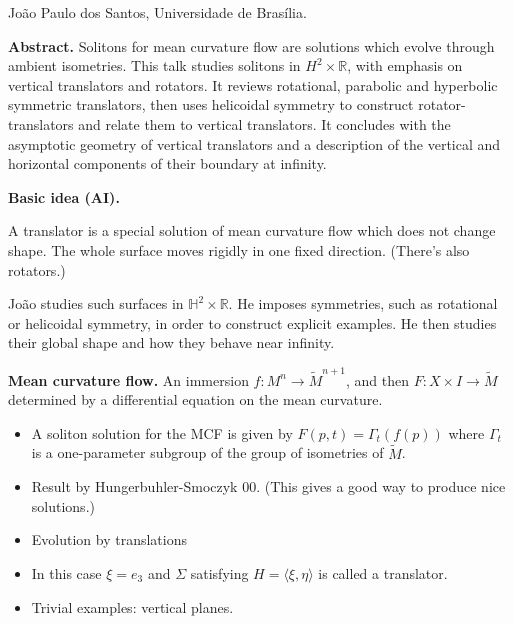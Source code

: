 \medskip\noindent
Jo\~ao Paulo dos Santos,
Universidade de Bras\'ilia.

\medskip\noindent
{\bf Abstract.}
Solitons for mean curvature flow are
solutions which evolve through ambient
isometries. This talk studies solitons in
$H^2 \times \mathbb{R}$, with emphasis on
vertical translators and rotators. It
reviews rotational, parabolic and
hyperbolic symmetric translators, then uses
helicoidal symmetry to construct
rotator-translators and relate them to
vertical translators. It concludes with
the asymptotic geometry of vertical
translators and a description of the
vertical and horizontal components of
their boundary at infinity.

\medskip\noindent
{\bf Basic idea (AI).}

A translator is a special solution of mean
curvature flow which does not change shape.
The whole surface moves rigidly in one fixed
direction. (There's also rotators.)

João studies such surfaces in
$\mathbb{H}^2\times \mathbb{R}$. He imposes
symmetries, such as rotational or helicoidal
symmetry, in order to construct explicit
examples. He then studies their global shape
and how they behave near infinity.


\medskip\noindent
{\bf Mean curvature flow.}
An immersion $f:M^n \to \tilde{M}^{n+1}$,
and then $F:X \times I \to \tilde{M}$
determined by a differential equation on the
mean curvature.

\begin{itemize}
\item A soliton solution for the MCF is
given by $F(p,t)=\Gamma_t(f(p))$ where
$\Gamma_t$ is a one-parameter subgroup of
the group of isometries of $\tilde{M}$.

\item Result by Hungerbuhler-Smoczyk 00.
(This gives a good way to produce nice
solutions.)
\end{itemize}

\begin{example}
\label{example-euclidean-space-soliton}
\begin{itemize}
\item Evolution by translations
\item  In this case $\xi = e_3$ and $\Sigma$
satisfying $H= \langle\xi,\eta\rangle$ is
called a translator.
\item Trivial examples: vertical planes.
\end{itemize}
\end{example}

